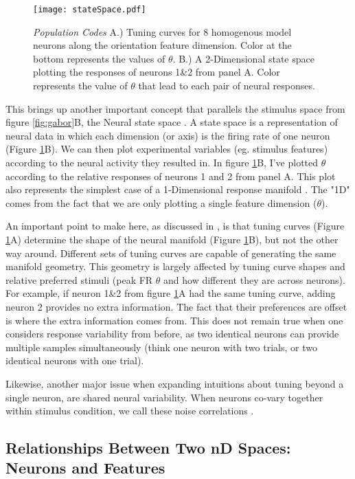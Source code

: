 \begin{figure}[h]
	\centerline{\texttt{[image: stateSpace.pdf]}}
	\caption{\textit{Population Codes} A.) Tuning curves for 8 homogenous model neurons along the orientation feature dimension. Color at the bottom represents the values of $\theta$. B.) A 2-Dimensional state space plotting the responses of neurons 1\&2 from panel A. Color represents the value of $\theta$ that lead to each pair of neural responses.  }
	\label{fig:stateSpace}
\end{figure}

This brings up another important concept that parallels the stimulus space from figure \ref{fig:gabor}B, the Neural state space \parencite{Paninski2010,Cross2021a}. A state space is a representation of neural data in which each dimension (or axis) is the firing rate of one neuron (Figure \ref{fig:stateSpace}B). We can then plot experimental variables (eg. stimulus features) according to the neural activity they resulted in. In figure \ref{fig:stateSpace}B, I've plotted $\theta$ according to the relative responses of neurons 1 and 2 from panel A. This plot also represents the simplest case of a 1-Dimensional response manifold \parencite{Kriegeskorte2021, Chung2018}. The "1D" comes from the fact that we are only plotting a single feature dimension ($\theta$).

An important point to make here, as discussed in \textcite{Kriegeskorte2021}, is that tuning curves (Figure \ref{fig:stateSpace}A) determine the shape of the neural manifold (Figure \ref{fig:stateSpace}B), but not the other way around. Different sets of tuning curves are capable of generating the same manifold geometry. This geometry is largely affected by tuning curve shapes and relative preferred stimuli (peak FR $\theta$ and how different they are across neurons). For example, if neuron 1\&2 from figure \ref{fig:stateSpace}A had the same tuning curve, adding neuron 2 provides no extra information. The fact that their preferences are offset is where the extra information comes from. This does not remain true when one considers response variability from before, as two identical neurons can provide multiple samples simultaneously (think one neuron with two trials, or two identical neurons with one trial). 

Likewise, another major issue when expanding intuitions about tuning beyond a single neuron, are shared neural variability. When neurons co-vary together within stimulus condition, we call these noise correlations \parencite{Cohen2010, Ruff2016, Snyder2014, Moreno-Bote2014a}.


\subsection{Relationships Between Two nD Spaces: Neurons and Features}



